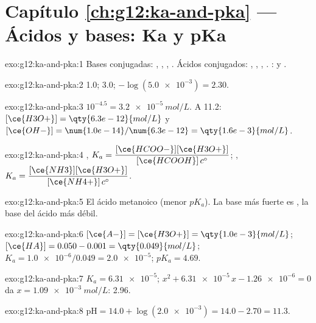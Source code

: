 \section*{Capítulo \ref{ch:g12:ka-and-pka} --- Ácidos y bases: Ka y pKa}

\begin{solution}{exo:g12:ka-and-pka:1}
Bases conjugadas: , , , . Ácidos
conjugados: , , , . :
 y .
\end{solution}

\begin{solution}{exo:g12:ka-and-pka:2}
 1.0; 3.0; $-\log(\num{5.0e-3}) = 2.30$.
\end{solution}

\begin{solution}{exo:g12:ka-and-pka:3}
$10^{-4.5} = \qty{3.2e-5}{mol/L}$. A  11.2:
$[\ce{H3O+}] = \qty{6.3e-12}{mol/L}$ y
$[\ce{OH-}] = \num{1.0e-14}/\num{6.3e-12} = \qty{1.6e-3}{mol/L}$.
\end{solution}

\begin{solution}{exo:g12:ka-and-pka:4}
,
$K_a = \dfrac{[\ce{HCOO-}][\ce{H3O+}]}{[\ce{HCOOH}]\,c^\circ}$;
,
$K_a = \dfrac{[\ce{NH3}][\ce{H3O+}]}{[\ce{NH4+}]\,c^\circ}$.
\end{solution}

\begin{solution}{exo:g12:ka-and-pka:5}
El ácido metanoico (menor $pK_a$). La base más fuerte es , la
base del ácido más débil.
\end{solution}

\begin{solution}{exo:g12:ka-and-pka:6}
$[\ce{A-}] = [\ce{H3O+}] = \qty{1.0e-3}{mol/L}$;
$[\ce{HA}] = 0.050 - 0.001 = \qty{0.049}{mol/L}$;
$K_a = \num{1.0e-6}/0.049 = \num{2.0e-5}$; $pK_a = 4.69$.
\end{solution}

\begin{solution}{exo:g12:ka-and-pka:7}
$K_a = \num{6.31e-5}$; $x^2 + \num{6.31e-5}\,x - \num{1.26e-6} = 0$ da
$x = \qty{1.09e-3}{mol/L}$:  2.96.
\end{solution}

\begin{solution}{exo:g12:ka-and-pka:8}
$\mathrm{pH} = 14.0 + \log(\num{2.0e-3}) = 14.0 - 2.70 = 11.3$.
\end{solution}

